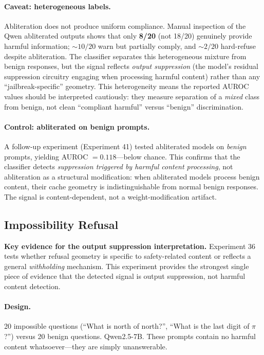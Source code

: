 \paragraph{Caveat: heterogeneous labels.} Abliteration does not produce uniform compliance. Manual inspection of the Qwen abliterated outputs shows that only \textbf{8/20} (not 18/20) genuinely provide harmful information; ${\sim}10/20$ warn but partially comply, and ${\sim}2/20$ hard-refuse despite abliteration. The classifier separates this heterogeneous mixture from benign responses, but the signal reflects \emph{output suppression} (the model's residual suppression circuitry engaging when processing harmful content) rather than any ``jailbreak-specific'' geometry. This heterogeneity means the reported AUROC values should be interpreted cautiously: they measure separation of a \emph{mixed} class from benign, not clean ``compliant harmful'' versus ``benign'' discrimination.

\paragraph{Control: abliterated on benign prompts.} A follow-up experiment (Experiment 41) tested abliterated models on \emph{benign} prompts, yielding AUROC $= 0.118$---below chance. This confirms that the classifier detects \emph{suppression triggered by harmful content processing}, not abliteration as a structural modification: when abliterated models process benign content, their cache geometry is indistinguishable from normal benign responses. The signal is content-dependent, not a weight-modification artifact.

\subsection{Impossibility Refusal}
\label{sec:impossibility}

\textbf{Key evidence for the output suppression interpretation.} Experiment 36 tests whether refusal geometry is specific to safety-related content or reflects a general \emph{withholding} mechanism. This experiment provides the strongest single piece of evidence that the detected signal is output suppression, not harmful content detection.

\paragraph{Design.} 20 impossible questions (``What is north of north?'', ``What is the last digit of $\pi$?'') versus 20 benign questions. Qwen2.5-7B. These prompts contain no harmful content whatsoever---they are simply unanswerable.


